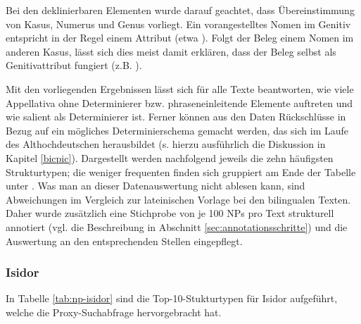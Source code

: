 \noindent 
Bei den deklinierbaren Elementen wurde darauf geachtet, dass Übereinstimmung von Kasus, Numerus und Genus vorliegt. Ein vorangestelltes Nomen im Genitiv entspricht in der Regel einem Attribut (etwa ). Folgt der Beleg einem Nomen im anderen Kasus, lässt sich dies meist damit erklären, dass  der Beleg selbst als Genitivattribut fungiert (z.B. ). 
 
Mit den vorliegenden Ergebnissen lässt sich für alle Texte beantworten, wie viele Appellativa ohne Determinierer bzw. phraseneinleitende Elemente auftreten und wie salient  als Determinierer ist. Ferner können aus den Daten Rückschlüsse in Bezug auf ein mögliches  Determinierschema gemacht werden, das sich im Laufe des Althochdeutschen herausbildet (s. hierzu ausführlich die Diskussion in Kapitel \ref{bicpic}). Dargestellt werden nachfolgend jeweils die zehn häufigsten Strukturtypen; die weniger frequenten finden sich gruppiert am Ende der Tabelle unter .  Was man an dieser Datenauswertung  nicht ablesen kann, sind  Abweichungen im Vergleich zur lateinischen Vorlage bei den bilingualen Texten. Daher wurde zusätzlich eine Stichprobe von je 100 NPs pro Text strukturell annotiert (vgl. die Beschreibung in Abschnitt \ref{sec:annotationsschritte}) und die Auswertung an den entsprechenden Stellen eingepflegt.


\subsubsection{Isidor}

In Tabelle \ref{tab:np-isidor} sind die Top-10-Stukturtypen für Isidor aufgeführt, welche die Proxy-Suchabfrage hervorgebracht hat. 

